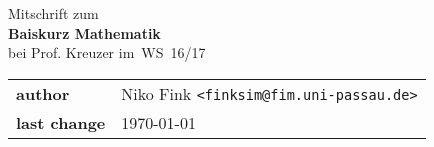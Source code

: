\documentclass[a4paper,10pt]{article}
\begin{document}
\begin{titlepage}
	\begin{center}
		\huge Mitschrift zum \\
		\Huge \textbf{Baiskurz Mathematik} \\
		\huge bei Prof. Kreuzer im WS 16/17 \\
		\normalsize

		\vspace{1cm}
		\begin{tabular}[b]{l|l}
			\textbf{author} & Niko Fink \texttt{<finksim@fim.uni-passau.de>} \\
			\textbf{last change} & \today
		\end{tabular}

		\vspace{1cm}
		\tableofcontents
	\end{center}
\end{titlepage}

\setcounter{section}{9}



\end{document}
